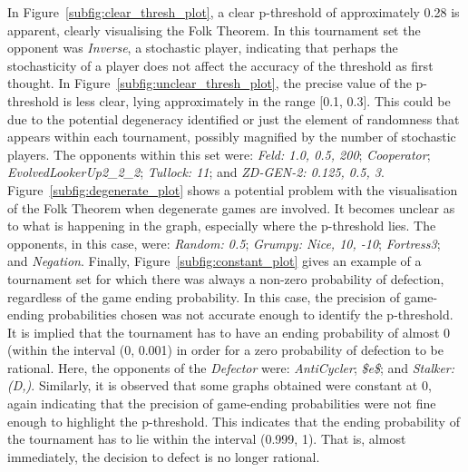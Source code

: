 In Figure~\ref{subfig:clear_thresh_plot}, a clear p-threshold of approximately
0.28 is apparent, clearly visualising the Folk Theorem. In this tournament set
the opponent was \textit{Inverse}, a stochastic player, indicating that perhaps
the stochasticity of a player does not affect the accuracy of the threshold as
first thought. In Figure~\ref{subfig:unclear_thresh_plot}, the precise value of
the p-threshold is less clear, lying approximately in the range [0.1, 0.3]. This
could be due to the potential degeneracy identified or just the element of
randomness that appears within each tournament, possibly magnified by the number
of stochastic players. The opponents within this set
were: \textit{Feld: 1.0, 0.5, 200}; \textit{Cooperator};
\textit{EvolvedLookerUp2\_2\_2}; \textit{Tullock: 11}; and \textit{ZD-GEN-2:
0.125, 0.5, 3}. Figure~\ref{subfig:degenerate_plot} shows a potential problem
with the visualisation of the Folk Theorem when degenerate games are involved.
It becomes unclear as to what is happening in the graph,
especially where the p-threshold lies. The opponents, in this case, were:
\textit{Random: 0.5}; \textit{Grumpy: Nice, 10, -10}; \textit{Fortress3}; and
\textit{Negation}. Finally, Figure~\ref{subfig:constant_plot} gives an example
of a tournament set for which there was always a non-zero probability of
defection, regardless of the game ending probability. In this case, the
precision of game-ending probabilities chosen was not accurate enough to
identify the p-threshold. It is implied that the tournament has to have an
ending probability of almost 0 (within the interval (0, 0.001) in order for a
zero probability of defection to be rational. Here, the opponents of the
\textit{Defector} were: \textit{AntiCycler}; \textit{\$e\$}; and
\textit{Stalker: (D,)}. Similarly, it is observed that some graphs obtained
were constant at 0, again indicating that the precision of game-ending
probabilities were not fine enough to highlight the p-threshold. This indicates
that the ending probability of the tournament has to lie within the interval
(0.999, 1). That is, almost immediately, the decision to defect is no longer rational.

\scalebox{0.52}{
    
}

